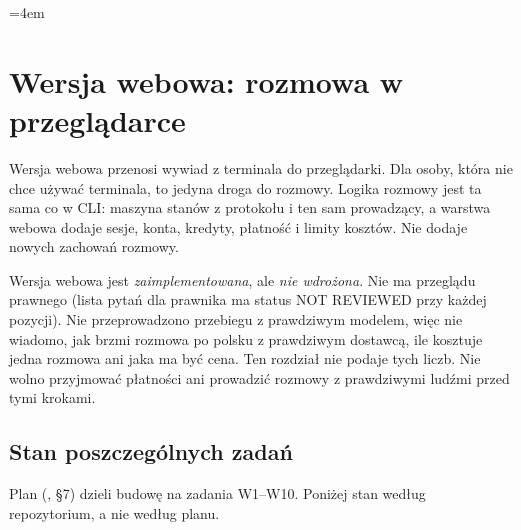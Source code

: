 {\sloppy\emergencystretch=4em
\section{Wersja webowa: rozmowa w przeglądarce}
\label{sec:webapp}

Wersja webowa przenosi wywiad z terminala do przeglądarki. Dla osoby, która
nie chce używać terminala, to jedyna droga do rozmowy. Logika rozmowy jest ta
sama co w CLI: maszyna stanów z protokołu i ten sam prowadzący, a warstwa
webowa dodaje sesje, konta, kredyty, płatność i limity kosztów. Nie dodaje
nowych zachowań rozmowy.

 Wersja webowa jest
\emph{zaimplementowana}, ale \emph{nie wdrożona}. Nie ma przeglądu prawnego
(lista pytań dla prawnika ma status NOT REVIEWED przy każdej pozycji). Nie
przeprowadzono przebiegu z prawdziwym modelem, więc nie wiadomo, jak brzmi
rozmowa po polsku z prawdziwym dostawcą, ile kosztuje jedna rozmowa ani jaka
ma być cena. Ten rozdział nie podaje tych liczb. Nie wolno przyjmować
płatności ani prowadzić rozmowy z prawdziwymi ludźmi przed tymi krokami.

\subsection{Stan poszczególnych zadań}

Plan (, §7) dzieli budowę na zadania
W1--W10. Poniżej stan według repozytorium, a nie według planu.

}
